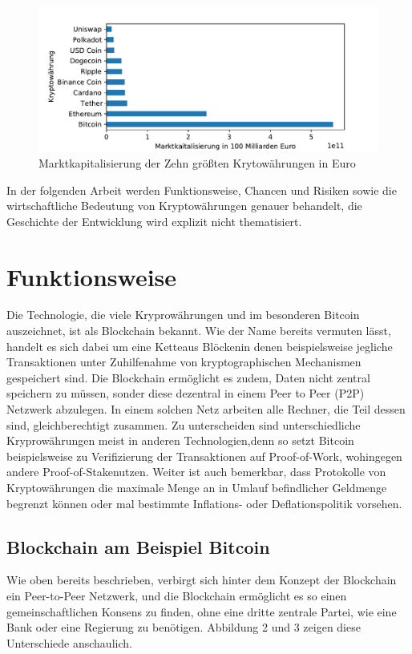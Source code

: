 \documentclass[12pt,oneside]{article}
\begin{document}
\begin{figure}[h]
\includegraphics[scale=0.9]{./images/marketcap.pdf}
\caption{Marktkapitalisierung der Zehn größten Krytowährungen in Euro \cite{coinmarketcap}}
\centering
\end{figure}


In der folgenden Arbeit werden Funktionsweise, Chancen und Risiken sowie die wirtschaftliche Bedeutung von Kryptowährungen genauer behandelt, die Geschichte der Entwicklung wird explizit nicht thematisiert.

\section{Funktionsweise}

Die Technologie, die viele Kryprowährungen und im besonderen Bitcoin auszeichnet, ist als Blockchain bekannt. Wie der Name bereits vermuten lässt, handelt es sich dabei um eine \glqq Kette\grqq aus \glqq Blöcken\grqq in denen beispielsweise jegliche Transaktionen unter Zuhilfenahme von kryptographischen Mechanismen gespeichert sind. \cite{soeteman2019}
Die Blockchain ermöglicht es zudem, Daten nicht zentral speichern zu müssen, sonder diese dezentral in einem Peer to Peer (P2P) Netzwerk  abzulegen. In einem solchen Netz arbeiten alle Rechner, die Teil dessen sind, gleichberechtigt zusammen. Zu unterscheiden sind unterschiedliche Kryprowährungen meist in anderen Technologien,denn  so setzt Bitcoin beispielsweise zu Verifizierung der Transaktionen auf \glqq Proof-of-Work\grqq, wohingegen andere \glqq Proof-of-Stake\grqq nutzen. Weiter ist auch bemerkbar, dass Protokolle von Kryptowährungen die maximale Menge an in Umlauf befindlicher Geldmenge begrenzt können oder mal bestimmte Inflations- oder Deflationspolitik vorsehen. \cite{wegner2019}


\subsection{Blockchain am Beispiel Bitcoin}
Wie oben bereits beschrieben, verbirgt sich hinter dem Konzept der Blockchain ein Peer-to-Peer Netzwerk, und die Blockchain ermöglicht es so einen gemeinschaftlichen Konsens zu finden, ohne eine dritte zentrale Partei, wie eine Bank oder eine Regierung zu benötigen. Abbildung 2 und 3 zeigen diese Unterschiede anschaulich. 
\end{document}

